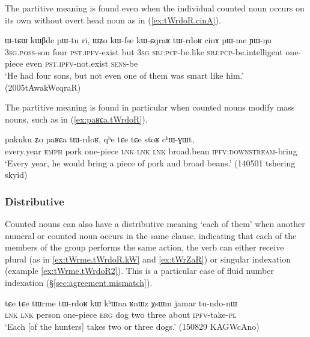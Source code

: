 The partitive meaning is found even when the individual counted noun occurs on its own without overt head noun as in (\ref{ex:tWrdoR.cinA}).

\begin{exe}
	\ex \label{ex:tWrdoR.cinA}
	\gll ɯ-tɕɯ kɯβde pɯ-tu ri, ɯʑo kɯ-fse kɯ-ɕqraʁ tɯ-rdoʁ cinɤ pɯ-me ɲɯ-ŋu 	\\
	\textsc{3sg}.\textsc{poss}-son four \textsc{pst}.\textsc{ipfv}-exist but \textsc{3sg} \textsc{sbj}:\textsc{pcp}-be.like \textsc{sbj}:\textsc{pcp}-be.intelligent one-piece even \textsc{pst}.\textsc{ipfv}-not.exist \textsc{sens}-be \\
	\glt `He had four sons, but not even one of them was smart like him.' (2005tAwakWcqraR)
\end{exe} 


The partitive meaning is found in particular when counted nouns modify mass nouns, such as  in (\ref{ex:paʁɕa.tWrdoR}).  

\begin{exe}
	\ex \label{ex:paʁɕa.tWrdoR}
	\gll pakuku ʑo paʁɕa tɯ-rdoʁ, qʰe tɕe tɕe stoʁ cʰɯ-ɣɯt, \\
	every.year \textsc{emph} pork one-piece \textsc{lnk} \textsc{lnk} \textsc{lnk} broad.bean \textsc{ipfv}:\textsc{downstream}-bring \\
	\glt `Every year, he would bring a piece of pork and broad beans.' (140501 tshering skyid)
\end{exe} 

\subsubsection{Distributive} \label{sec:CN.distributive}
Counted nouns can also have a distributive meaning  `each of them' when another numeral or counted noun occurs in the same clause, indicating that each of the members of the group performs the same action, the verb can either receive plural (as in \ref{ex:tWrme.tWrdoR.kW} and \ref{ex:tWrZaR}) or singular indexation (example \ref{ex:tWrme.tWrdoR2}). This is a particular case of fluid number indexation (§\ref{sec:agreement.mismatch}).

\begin{exe}
	\ex \label{ex:tWrme.tWrdoR.kW}
	\gll  tɕe tɕe tɯrme tɯ-rdoʁ kɯ kʰɯna ʁnɯz χsɯm jamar tu-ndo-nɯ \\
	\textsc{lnk} \textsc{lnk}  person one-piece \textsc{erg} dog two three about \textsc{ipfv}-take-\textsc{pl} \\
	\glt `Each [of the hunters] takes two or three dogs.' (150829 KAGWcAno)
\end{exe} 

